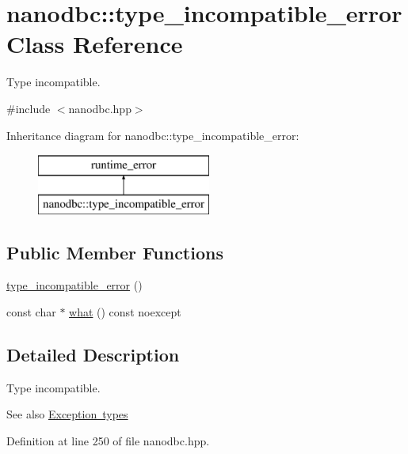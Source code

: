\hypertarget{classnanodbc_1_1type__incompatible__error}{}\section{nanodbc\+::type\+\_\+incompatible\+\_\+error Class Reference}
\label{classnanodbc_1_1type__incompatible__error}


Type incompatible.  




{\ttfamily \#include $<$nanodbc.\+hpp$>$}

Inheritance diagram for nanodbc\+::type\+\_\+incompatible\+\_\+error\+:\begin{figure}[H]
\begin{center}
\leavevmode
\includegraphics[height=2.000000cm]{classnanodbc_1_1type__incompatible__error}
\end{center}
\end{figure}
\subsection*{Public Member Functions}
\begin{DoxyCompactItemize}
\item 
\mbox{\hyperlink{classnanodbc_1_1type__incompatible__error_a3d4a2648703bb661fe4043d165f0b21a}{type\+\_\+incompatible\+\_\+error}} ()
\item 
const char $\ast$ \mbox{\hyperlink{classnanodbc_1_1type__incompatible__error_ab5467c27a248427c0b292bd6e4a5769d}{what}} () const noexcept
\end{DoxyCompactItemize}


\subsection{Detailed Description}
Type incompatible. 

\begin{DoxySeeAlso}{See also}
\mbox{\hyperlink{group__exceptions}{Exception types}} 
\end{DoxySeeAlso}


Definition at line 250 of file nanodbc.\+hpp.



